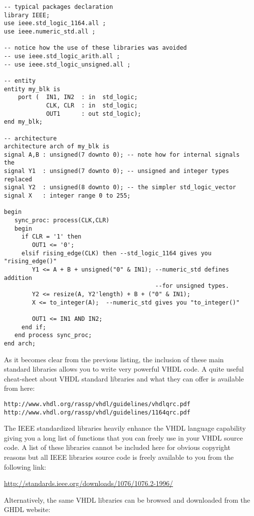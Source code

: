 \begin{lstlisting}[label=good_lib_ex, caption=Example of operators and types available with some IEEE packages.]
-- typical packages declaration
library IEEE;
use ieee.std_logic_1164.all ;
use ieee.numeric_std.all ;

-- notice how the use of these libraries was avoided
-- use ieee.std_logic_arith.all ;
-- use ieee.std_logic_unsigned.all ;

-- entity
entity my_blk is 
    port (  IN1, IN2  : in  std_logic;
            CLK, CLR  : in  std_logic; 
            OUT1      : out std_logic); 
end my_blk;

-- architecture
architecture arch of my_blk is
signal A,B : unsigned(7 downto 0); -- note how for internal signals the
signal Y1  : unsigned(7 downto 0); -- unsigned and integer types replaced
signal Y2  : unsigned(8 downto 0); -- the simpler std_logic_vector
signal X   : integer range 0 to 255;

begin
   sync_proc: process(CLK,CLR)
   begin
     if CLR = '1' then 
        OUT1 <= '0';  
     elsif rising_edge(CLK) then --std_logic_1164 gives you "rising_edge()"
        Y1 <= A + B + unsigned("0" & IN1); --numeric_std defines addition
                                           --for unsigned types.
        Y2 <= resize(A, Y2'length) + B + ("0" & IN1);  
        X <= to_integer(A);  --numeric_std gives you "to_integer()"

        OUT1 <= IN1 AND IN2; 
     end if; 
   end process sync_proc; 
end arch;
\end{lstlisting}
As it becomes clear from the previous listing, the inclusion of these main standard libraries allows you to write very powerful VHDL code. A quite useful cheat-sheet about VHDL standard libraries and what they can offer is available from here:
\begin{verbatim}
http://www.vhdl.org/rassp/vhdl/guidelines/vhdlqrc.pdf
http://www.vhdl.org/rassp/vhdl/guidelines/1164qrc.pdf
\end{verbatim}

The IEEE standardized libraries heavily enhance the VHDL language capability giving you a long list of functions that you can freely use in your VHDL source code. A list of these libraries cannot be included here for obvious copyright reasons but all IEEE libraries source code is freely available to you from the following link:

\url{http://standards.ieee.org/downloads/1076/1076.2-1996/}

Alternatively, the same VHDL libraries can be browsed and downloaded from the GHDL website:

